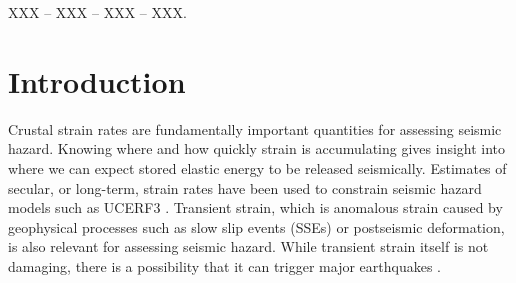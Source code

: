 \documentclass[extra,mreferee]{gji}
\begin{document}
\begin{keywords}
 XXX -- XXX -- XXX -- XXX.
\end{keywords}

\section{Introduction}\label{sec:Introduction}


Crustal strain rates are fundamentally important quantities for
assessing seismic hazard. Knowing where and how quickly strain is
accumulating gives insight into where we can expect stored elastic
energy to be released seismically. Estimates of secular, or long-term,
strain rates have been used to constrain seismic hazard models such as
UCERF3 \citep{Field2014}. Transient strain, which is anomalous strain
caused by geophysical processes such as slow slip events (SSEs) or
postseismic deformation, is also relevant for assessing seismic
hazard. While transient strain itself is not damaging, there is a
possibility that it can trigger major earthquakes
\citep{Roeloffs2006,Freed2001}.

\end{document}
